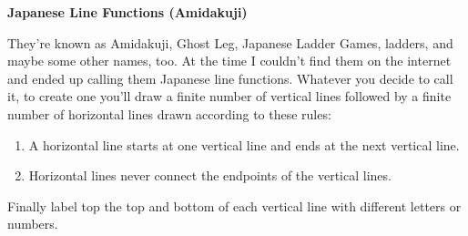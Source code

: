 \documentclass[12pt]{article}%
\begin{document}
\begin{center}
\Large{\textbf{Japanese Line Functions (Amidakuji)}}
\end{center}
They're known as Amidakuji, Ghost Leg, Japanese Ladder Games, 
ladders, and maybe some other names, too. At the time I couldn't
find them on the internet and ended up calling them Japanese 
line functions. Whatever you decide to call it, to create one you'll
draw a finite number of vertical lines followed by 
a finite number of horizontal lines drawn according to these rules:

\begin{enumerate}
	\item A horizontal line starts at one vertical line and ends 
	at the next vertical line.
	\item Horizontal lines never connect the endpoints of the vertical lines.
\end{enumerate}
Finally label top the top and bottom of each vertical line with 
different letters or numbers.
\end{document}
